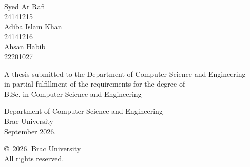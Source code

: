 %

\begin{titlepage}
\renewcommand*{\thepage}{Title}

    \begin{center}
        \vspace*{3cm}

        {\fontsize{16pt}{22pt}\selectfont{A Vision-Language Based Framework for
        Extracting and Understanding Classroom Content in Dual Languages}
        }

        \vspace{1.5cm}


        \vspace{0.5cm}

            Syed Ar Rafi\\
            {24141215}\\
            Adiba Islam Khan\\
            {24141216}\\
            Ahsan Habib\\
            {22201027}

        \vspace{1.5cm}

            A thesis submitted to the Department of Computer Science and Engineering\\
            in partial fulfillment of the requirements for the degree of\\
            B.Sc. in Computer Science and Engineering

        \vspace{2.5cm}

            Department of Computer Science and Engineering\\
            Brac University\\
            September 2026.

        \vspace{3cm}

            \copyright\ 2026. Brac University\\
            All rights reserved.

    \end{center}

\end{titlepage}
